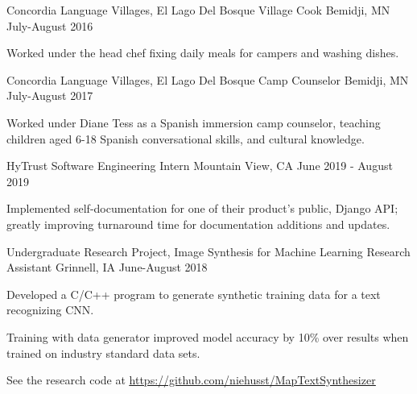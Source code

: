 \documentclass[12pt, a4paper]{awesome-cv}
\begin{document}
\begin{cventries}
\cventry
  {Concordia Language Villages, El Lago Del Bosque}
  {Village Cook}
  {Bemidji, MN}
  {July-August 2016}
  {
    \begin{cvitems}
      \item {Worked under the head chef fixing daily meals for campers and
    washing dishes.}
    \end{cvitems}
  }

  \cventry
    {Concordia Language Villages, El Lago Del Bosque}
    {Camp Counselor}
    {Bemidji, MN}
    {July-August 2017}
    {
      \begin{cvitems}
        \item {Worked under Diane Tess as a Spanish immersion camp counselor, teaching children aged 6-18 Spanish conversational skills, and cultural knowledge.}
      \end{cvitems}
    }


  \cventry
    {HyTrust}
    {Software Engineering Intern}
    {Mountain View, CA}
    {June 2019 - August 2019}
    {
      \begin{cvitems}
	\item {Implemented self-documentation for one of their product's public, Django API; greatly improving turnaround time for documentation additions and updates.}
      \end{cvitems}
    }


  \cventry
    {Undergraduate Research Project, Image Synthesis for Machine Learning}
    {Research Assistant}
    {Grinnell, IA}
    {June-August 2018}
    {
      \begin{cvitems}
        \item {Developed a C/C++ program to generate synthetic training data for a text recognizing CNN.}
        \item{Training with data generator improved model accuracy by 10\% over results when trained on industry standard data sets.}
	\item{See the research code at \underline{\href{https://github.com/niehusst/MapTextSynthesizer}{https://github.com/niehusst/MapTextSynthesizer}}}
      \end{cvitems}
    }



\end{cventries}
\end{document}
